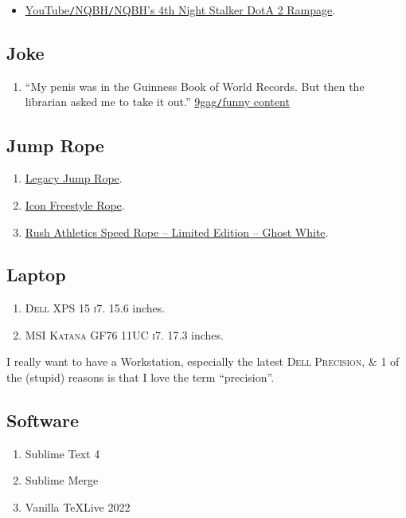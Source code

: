 \documentclass{article}
\numberwithin{equation}{section}
\begin{document}
\begin{itemize}
	\item \href{https://www.youtube.com/watch?v=d9vmHp-4f3k}{YouTube\texttt{/}NQBH\texttt{/}NQBH's 4th Night Stalker DotA 2 Rampage}.
\end{itemize}

\subsection{Joke}

\begin{enumerate}
	\item ``My penis was in the Guinness Book of World Records. But then the librarian asked me to take it out.'' \href{https://9gag.com/gag/aPZPm6q}{9gag\texttt{/}funny content}
\end{enumerate}

\subsection{Jump Rope}

\begin{enumerate}
	\item \href{https://www.rushathletics.co.uk/collections/ropes/products/legacy-jump-rope}{Legacy Jump Rope}.
	\item \href{https://www.rushathletics.co.uk/collections/ropes/products/icon-freestyle-rope}{Icon Freestyle Rope}.
	\item \href{https://www.rushathletics.co.uk/collections/ropes/products/rush-athletics-speed-rope-ghost-white}{Rush Athletics Speed Rope -- Limited Edition -- Ghost White}.
\end{enumerate}

\subsection{Laptop}

\begin{enumerate}
	\item \textsc{Dell XPS 15 i7.} 15.6 inches.
	\item \textsc{MSI Katana GF76 11UC i7.} 17.3 inches.
\end{enumerate}
I really want to have a Workstation, especially the latest \textsc{Dell Precision}, \& 1 of the (stupid) reasons is that I love the term ``precision''.

\subsection{Software}

\begin{enumerate}
	\item Sublime Text 4
	\item Sublime Merge
	\item Vanilla \TeX Live 2022
\end{enumerate}


\printbibliography[heading=bibintoc]
\end{document}
